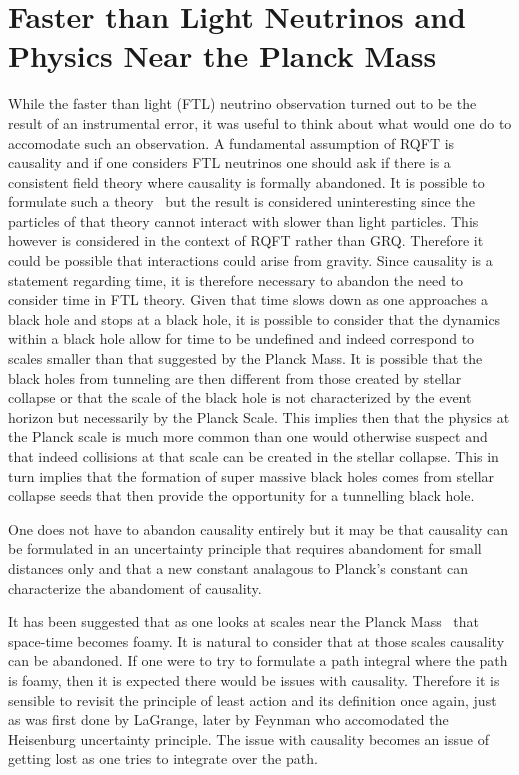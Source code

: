\documentclass[a4paper]{article}
\begin{document}
\section{Faster than Light Neutrinos and Physics Near the Planck Mass}
\label{sec:ftl}
While the faster than light (FTL) neutrino observation turned out to be the result of an instrumental error, it was
useful to think about what would one do to accomodate such an observation.  A fundamental assumption of
RQFT is causality and if one considers FTL neutrinos one should ask if there is a consistent field theory
where causality is formally abandoned.  It is possible to formulate such a theory~\cite{ref:QFTFTL} but the 
result is considered uninteresting since the particles of that theory cannot interact with slower than light
particles.  This however is considered in the context of RQFT rather than GRQ. Therefore it could be possible
that interactions could arise from gravity. Since causality is a statement regarding time, it is therefore 
necessary to abandon the need to consider time in FTL theory. Given that time slows down as one approaches
a black hole and stops at a black hole, it is possible to consider that the dynamics within a black hole allow
for time to be undefined and indeed correspond to scales smaller than that suggested by the Planck Mass. It is
possible that the black holes from tunneling are then different from those created by stellar collapse or that
the scale of the black hole is not characterized by the event horizon but necessarily by the Planck Scale. This
implies then that the physics at the Planck scale is much more common than one would otherwise 
suspect and that indeed collisions at that scale can be created in the stellar collapse. This in turn implies
that the formation of super massive black holes comes from stellar collapse seeds that then provide the
opportunity for a tunnelling black hole.

One does not have to abandon causality entirely but it may be that causality can be formulated 
in an uncertainty principle that requires abandoment for small distances only and that a new
constant analagous to Planck's constant can characterize the abandoment of causality.

It has been suggested that as one looks at scales near the Planck Mass~\cite{ref:wheeler} that space-time becomes
foamy.  It is natural to consider that at those scales causality can be abandoned.  If one were to try
to formulate a path integral where the path is foamy, then it is expected there would be issues with causality.
Therefore it is sensible to revisit the principle of least action and its definition once again, just as
was first done by LaGrange, later by Feynman who accomodated the Heisenburg uncertainty principle.  The issue
with causality becomes an issue of getting lost as one tries to integrate over the path. 
\end{document}
